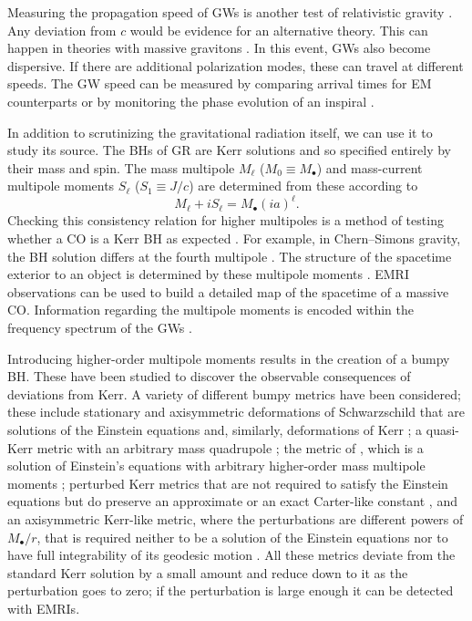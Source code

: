 Measuring the propagation speed of GWs is another test of relativistic gravity \citep[section 10.1]{Will1993}. Any deviation from $c$ would be evidence for an alternative theory. This can happen in theories with massive gravitons \citep{Babak2003,Goldhaber2010}. In this event, GWs also become dispersive. If there are additional polarization modes, these can travel at different speeds. The GW speed can be measured by comparing arrival times for EM counterparts \citep[e.g.,][]{Cooray2004,Kocsis2008} or by monitoring the phase evolution of an inspiral \citep{Will1998,Berti2011}.

In addition to scrutinizing the gravitational radiation itself, we can use it to study its source. The BHs of GR are Kerr solutions and so specified entirely by their mass and spin. The mass multipole $M_\ell$ ($M_0 \equiv M_\bullet$) and mass-current multipole moments $S_\ell$ ($S_1 \equiv J/c$) are determined from these according to \citep{Hansen1974}
\begin{equation}
M_\ell + iS_\ell = M_\bullet \left(ia\right)^\ell.
\end{equation}
Checking this consistency relation for higher multipoles is a method of testing whether a CO is a Kerr BH as expected \citep{Gair2012}. For example, in Chern--Simons gravity, the BH solution differs at the fourth multipole \citep{Sopuerta2009a}.  The structure of the spacetime exterior to an object is determined by these multipole moments \citep{Geroch1970}. EMRI observations can be used to build a detailed map of the spacetime of a massive CO. Information regarding the multipole moments is encoded within the frequency spectrum of the GWs \citep{Ryan1995,Ryan1997}.

Introducing higher-order multipole moments results in the creation of a bumpy BH. These have been studied to discover the observable consequences of deviations from Kerr. A variety of different bumpy metrics have been considered; these include stationary and axisymmetric deformations of Schwarzschild that are solutions of the Einstein equations \citep{Collins2004} and, similarly, deformations of Kerr \citep{Vigeland2010a}; a quasi-Kerr metric with an arbitrary mass quadrupole \citep{Glampedakis2006a,Barack2007}; the metric of \citet{Manko1992}, which is a solution of Einstein's equations with arbitrary higher-order mass multipole moments \citep{Gair2008}; perturbed Kerr metrics that are not required to satisfy the Einstein equations but do preserve an approximate or an exact Carter-like constant \citep{Vigeland2011,Gair2011,Johannsen2013b}, and an axisymmetric Kerr-like metric, where the perturbations are different powers of $M_\bullet/r$, that is required neither to be a solution of the Einstein equations nor to have full integrability of its geodesic motion \citep{Johannsen2011}. All these metrics deviate from the standard Kerr solution by a small amount and reduce down to it as the perturbation goes to zero; if the perturbation is large enough it can be detected with EMRIs.

